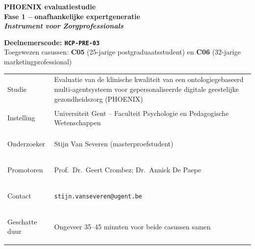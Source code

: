 \documentclass[11pt,a4paper]{article}
\renewcommand{\arraystretch}{1.28}
\begin{document}
\thispagestyle{fancy}
\vspace*{0.3cm}

\begin{tcolorbox}[
  colback=DarkBlue,colframe=DarkBlue,
  arc=3mm,left=14pt,right=14pt,top=12pt,bottom=12pt,
  width=\textwidth
]
\centering
{\fontsize{22}{28}\selectfont\bfseries\color{white}
PHOENIX evaluatiestudie\\[0.3em]
\fontsize{15}{20}\selectfont\color{AccentBlue}
Fase 1 -- onafhankelijke expertgeneratie\\[0.2em]
\fontsize{12}{16}\selectfont\color{white}
\textit{Instrument voor Zorgprofessionals}
}
\end{tcolorbox}

\vspace{0.6cm}

\begin{center}
\begin{tcolorbox}[
  colback=AccentBlue,colframe=PrimaryBlue,
  arc=2.5mm,boxrule=1.2pt,left=12pt,right=12pt,top=10pt,bottom=10pt,
  width=0.86\textwidth
]
\centering
{\large\bfseries\color{DarkBlue}Deelnemerscode: \texttt{HCP-PRE-03}}\\[0.5em]
{\normalsize\color{SlateMid}
Toegewezen casussen:\quad
\textbf{\color{PrimaryBlue}C05} (25-jarige postgraduaatsstudent)
\quad en \quad
\textbf{\color{PrimaryBlue}C06} (32-jarige marketingprofessional)
}
\end{tcolorbox}
\end{center}

\vspace{0.5cm}

\begin{center}
\begin{tcolorbox}[
  colback=SoftBG,colframe=BorderGrey,
  arc=2mm,left=10pt,right=10pt,top=9pt,bottom=9pt,
  width=0.92\textwidth
]
\small\renewcommand{\arraystretch}{1.28}
\begin{tabularx}{\textwidth}{@{}>{\bfseries\raggedright\arraybackslash}p{}X@{}}
Studie & Evaluatie van de klinische kwaliteit van een ontologiegebaseerd multi-agentsysteem voor gepersonaliseerde digitale geestelijke gezondheidszorg (PHOENIX) \\
Instelling & Universiteit Gent -- Faculteit Psychologie en Pedagogische Wetenschappen \\
Onderzoeker & Stijn Van Severen (masterproefstudent) \\
Promotoren & Prof.\ Dr.\ Geert Crombez; Dr.\ Annick De Paepe \\
Contact & \texttt{stijn.vanseveren@ugent.be} \\
Geschatte duur & Ongeveer 35--45 minuten voor beide casussen samen \\
\end{tabularx}
\end{tcolorbox}
\end{center}
\end{document}
